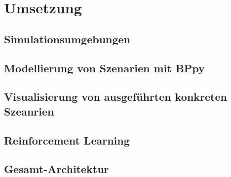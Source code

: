\chapter{Umsetzung}

\section{Simulationsumgebungen}
\section{Modellierung von Szenarien mit BPpy}
\section{Visualisierung von ausgeführten konkreten Szeanrien}
\section{Reinforcement Learning}
\section{Gesamt-Architektur}